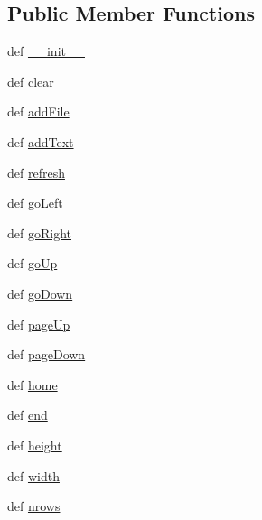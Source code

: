 \subsection*{Public Member Functions}
\begin{DoxyCompactItemize}
\item 
def \hyperlink{classcurseshelpers_1_1TabbedText_ac1ade8a7dd80c959ae2183699d7d0d69}{\-\_\-\-\_\-init\-\_\-\-\_\-}
\item 
def \hyperlink{classcurseshelpers_1_1TabbedText_a84ed10e54e7380349e8056bca5531846}{clear}
\item 
def \hyperlink{classcurseshelpers_1_1TabbedText_a1d357f22dd05a28c5a52ff59cd6d2c5c}{add\-File}
\item 
def \hyperlink{classcurseshelpers_1_1TabbedText_a8346994c80264e62e2db0ffd4de6da47}{add\-Text}
\item 
def \hyperlink{classcurseshelpers_1_1TabbedText_a38da2dd6771dfc66093d9db28eb85c2d}{refresh}
\item 
def \hyperlink{classcurseshelpers_1_1TabbedText_a404d801b0e2a671be62489f006327c3f}{go\-Left}
\item 
def \hyperlink{classcurseshelpers_1_1TabbedText_aa0cc16731c7032056ffe43eca0f73230}{go\-Right}
\item 
def \hyperlink{classcurseshelpers_1_1TabbedText_ad5f4e3a1ddb9af166d81688e328ea304}{go\-Up}
\item 
def \hyperlink{classcurseshelpers_1_1TabbedText_ab1bf972c7f8688d18ec9f919fe30243e}{go\-Down}
\item 
def \hyperlink{classcurseshelpers_1_1TabbedText_a68c2062ea6a6515dcd5f1204b825fab7}{page\-Up}
\item 
def \hyperlink{classcurseshelpers_1_1TabbedText_ab900d0406a153a930d3387887aeb3801}{page\-Down}
\item 
def \hyperlink{classcurseshelpers_1_1TabbedText_a92bf0dc19421baec8dee5e795ea0c1fc}{home}
\item 
def \hyperlink{classcurseshelpers_1_1TabbedText_a81f845d93e77f3a24a862e52bfb8ade0}{end}
\item 
def \hyperlink{classcurseshelpers_1_1TabbedText_a405d197f3e0f35931555b74c6f428f96}{height}
\item 
def \hyperlink{classcurseshelpers_1_1TabbedText_a2f215e7a4fb5778191e7989c71103604}{width}
\item 
def \hyperlink{classcurseshelpers_1_1TabbedText_ae496c0f90e707cbf505de2870453e447}{nrows}
\end{DoxyCompactItemize}
